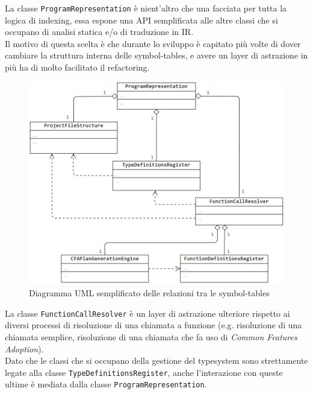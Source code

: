 \newpage

La classe \texttt{ProgramRepresentation} è nient'altro che una facciata per tutta la logica di indexing, essa 
espone una API semplificata alle altre classi che si occupano di analisi statica e/o di traduzione in IR. \\

Il motivo di questa scelta è che durante lo sviluppo è capitato più volte di dover cambiare la struttura interna
delle symbol-tables, e avere un layer di astrazione in più ha di molto facilitato il refactoring. \\

\begin{figure}[h]
    \centering
        \includegraphics[width=1\textwidth]{../../Assets/OverviewIndexing.png}
    \caption{Diagramma UML semplificato delle relazioni tra le symbol-tables}
\end{figure}

La classe \texttt{FunctionCallResolver} è un layer di astrazione ulteriore rispetto ai diversi processi di risoluzione 
di una chiamata a funzione (e.g. risoluzione di una chiamata semplice, risoluzione di una chiamata che fa uso di \textit{Common Features Adoption}). \\

Dato che le classi che si occupano della gestione del typesystem sono strettamente legate alla classe \texttt{TypeDefinitionsRegister},
anche l'interazione con queste ultime è mediata dalla classe \texttt{ProgramRepresentation}. \\
